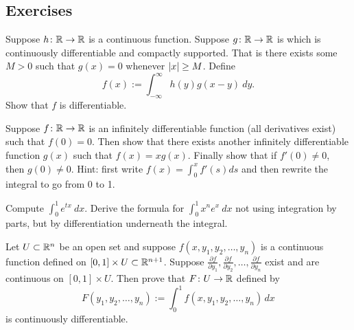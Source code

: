 \subsection{Exercises}

\begin{exercise}
Suppose $h \colon {\mathbb{R}} \to {\mathbb{R}}$ is a continuous function.  Suppose $g
\colon {\mathbb{R}} \to {\mathbb{R}}$ is which is continuously differentiable and compactly
supported.  That is there exists some $M > 0$ such that $g(x) = 0$ whenever
$\left\lvert {x} \right\rvert \geq M$.  Define
\begin{equation*}
f(x) := \int_{-\infty}^\infty h(y)g(x-y)~dy  .
\end{equation*}
Show that $f$ is differentiable.
\end{exercise}

\begin{exercise}
Suppose $f \colon {\mathbb{R}} \to {\mathbb{R}}$ is an infinitely differentiable function (all derivatives exist)
such that $f(0) = 0$.  Then show that there exists another infinitely
differentiable function $g(x)$ such that $f(x) = xg(x)$.  Finally show that
if $f'(0) \not= 0$, then $g(0) \not= 0$.  Hint: first write
$f(x) = \int_0^x f'(s) ds$ and then rewrite the integral to go from $0$ to
1.
\end{exercise}


\begin{exercise}
Compute $\int_0^1 e^{tx} ~dx$.  Derive the formula for
$\int_0^1 x^n e^{x} ~dx$ not using integration by parts, but
by differentiation underneath the integral.
\end{exercise}

\begin{exercise}
Let $U \subset {\mathbb{R}}^n$ be an open set and suppose
$f(x,y_1,y_2,\ldots,y_n)$ is a continuous
function defined on $[0,1] \times U \subset {\mathbb{R}}^{n+1}$.
Suppose
$\frac{\partial f}{\partial y_1},
\frac{\partial f}{\partial y_2},\ldots,
\frac{\partial f}{\partial y_n}$
exist and are continuous on $[0,1] \times U$.
Then prove that $F \colon U \to {\mathbb{R}}$ defined by
\begin{equation*}
F(y_1,y_2,\ldots,y_n) :=
\int_0^1
f(x,y_1,y_2,\ldots,y_n)
\, dx
\end{equation*}
is continuously differentiable.
\end{exercise}

